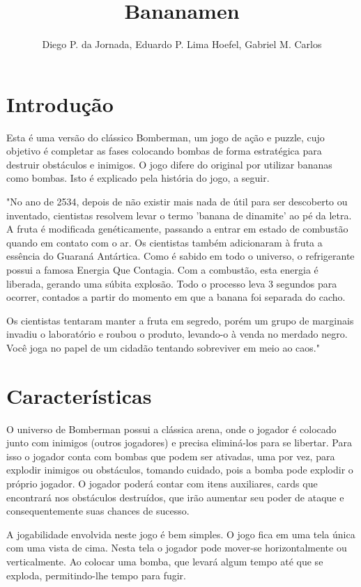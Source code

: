 \documentclass[12pt]{article}
\title{Bananamen}
\author{Diego P. da Jornada, Eduardo P. Lima Hoefel, Gabriel M. Carlos}
\begin{document}
 

\maketitle

\section{Introdução}

	Esta é uma versão do clássico Bomberman, um jogo de ação
	e puzzle, cujo objetivo é completar as fases colocando
	bombas de forma estratégica para destruir obstáculos e
	inimigos. O jogo difere do original por utilizar bananas
	como bombas. Isto é explicado pela história do jogo, a seguir.
	
	"No ano de 2534, depois de não existir mais nada de útil
	para ser descoberto ou inventado, cientistas resolvem
	levar o termo 'banana de dinamite' ao pé da letra. A fruta
	é modificada genéticamente, passando a entrar em estado de
	combustão quando em contato com o ar. Os cientistas também
	adicionaram à fruta a essência do Guaraná Antártica\textregistered.
	Como é sabido em todo o universo, o refrigerante possui a 
	famosa Energia Que Contagia\texttrademark. Com a combustão,
	esta energia é liberada, gerando uma súbita explosão.
	Todo o processo leva 3 segundos para ocorrer, contados a 
	partir do momento em que a banana foi separada do cacho.

	Os cientistas tentaram manter a fruta em segredo, porém
	um grupo de marginais invadiu o laboratório e roubou o
	produto, levando-o à venda no merdado negro. Você joga no
	papel de um cidadão tentando sobreviver em meio ao caos."

\section{Características}

	O universo de Bomberman possui a clássica arena, onde o
	jogador é colocado junto com inimigos (outros jogadores)
	e precisa eliminá-los para se libertar. Para isso o
	jogador conta com bombas que podem ser ativadas, uma por
	vez, para explodir inimigos ou obstáculos, tomando
	cuidado, pois a bomba pode explodir o próprio jogador. O
	jogador poderá contar com itens auxiliares, cards que
	encontrará nos obstáculos destruídos, que irão aumentar
	seu poder de ataque e consequentemente suas chances de
	sucesso.

	A jogabilidade envolvida neste jogo é bem simples. O
	jogo fica em uma tela única com uma vista de cima. Nesta
	tela o jogador pode mover-se horizontalmente ou
	verticalmente. Ao colocar uma bomba, que levará algum
	tempo até que se exploda, permitindo-lhe tempo para
	fugir.
\end{document}
